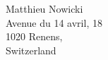 \cleardoublepage
\thispagestyle{empty}


\vspace*{18cm}

\begin{raggedleft}
	Matthieu Nowicki \\
	Avenue du 14 avril, 18 \\
	1020 Renens, \\
	Switzerland\\
\end{raggedleft}



